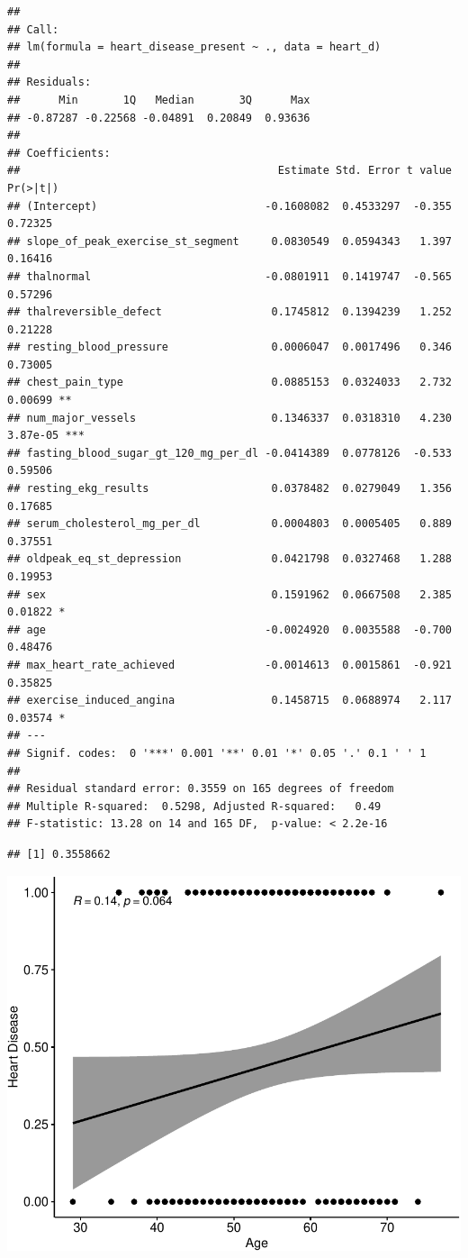 \documentclass[11pt,preprint, authoryear]{elsarticle}
\numberwithin{equation}{section}
\numberwithin{figure}{section}
\numberwithin{table}{section}
\begin{document}
\begin{verbatim}
## 
## Call:
## lm(formula = heart_disease_present ~ ., data = heart_d)
## 
## Residuals:
##      Min       1Q   Median       3Q      Max 
## -0.87287 -0.22568 -0.04891  0.20849  0.93636 
## 
## Coefficients:
##                                        Estimate Std. Error t value Pr(>|t|)    
## (Intercept)                          -0.1608082  0.4533297  -0.355  0.72325    
## slope_of_peak_exercise_st_segment     0.0830549  0.0594343   1.397  0.16416    
## thalnormal                           -0.0801911  0.1419747  -0.565  0.57296    
## thalreversible_defect                 0.1745812  0.1394239   1.252  0.21228    
## resting_blood_pressure                0.0006047  0.0017496   0.346  0.73005    
## chest_pain_type                       0.0885153  0.0324033   2.732  0.00699 ** 
## num_major_vessels                     0.1346337  0.0318310   4.230 3.87e-05 ***
## fasting_blood_sugar_gt_120_mg_per_dl -0.0414389  0.0778126  -0.533  0.59506    
## resting_ekg_results                   0.0378482  0.0279049   1.356  0.17685    
## serum_cholesterol_mg_per_dl           0.0004803  0.0005405   0.889  0.37551    
## oldpeak_eq_st_depression              0.0421798  0.0327468   1.288  0.19953    
## sex                                   0.1591962  0.0667508   2.385  0.01822 *  
## age                                  -0.0024920  0.0035588  -0.700  0.48476    
## max_heart_rate_achieved              -0.0014613  0.0015861  -0.921  0.35825    
## exercise_induced_angina               0.1458715  0.0688974   2.117  0.03574 *  
## ---
## Signif. codes:  0 '***' 0.001 '**' 0.01 '*' 0.05 '.' 0.1 ' ' 1
## 
## Residual standard error: 0.3559 on 165 degrees of freedom
## Multiple R-squared:  0.5298, Adjusted R-squared:   0.49 
## F-statistic: 13.28 on 14 and 165 DF,  p-value: < 2.2e-16
\end{verbatim}

\begin{verbatim}
## [1] 0.3558662
\end{verbatim}

\includegraphics{ML_project_files/figure-latex/unnamed-chunk-7-1.pdf}
\end{document}
